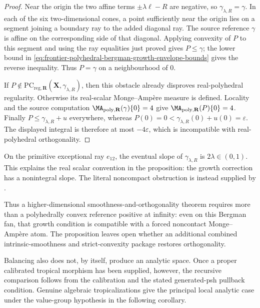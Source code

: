 \begin{proof}
Near the origin the two affine terms \(\pm\lambda\ell-R\) are negative,
so \(\gamma_{\lambda,R}=\gamma\).  In each of the six two-dimensional
cones, a point sufficiently near the origin lies on a segment joining a
boundary ray to the added diagonal ray.  The source reference \(\gamma\)
is affine on the corresponding side of that diagonal.  Applying convexity
of \(P\) to this segment and using the ray equalities just proved gives
\(P\leq\gamma\); the lower bound in
\eqref{eq:frontier-polyhedral-bergman-growth-envelope-bounds} gives the
reverse inequality.  Thus \(P=\gamma\) on a neighbourhood of \(0\).

If
\(P\notin\mathrm{PC}_{\mathrm{reg},\mathbf R}
(\mathbf X,\gamma_{\lambda,R})\), then this obstacle already disproves
real-polyhedral regularity.  Otherwise its real-scalar Monge--Amp\`ere
measure is defined.  Locality and the source computation
\(\MA_{\mathrm{poly},\mathbf R}(\gamma)\{0\}=4\) give
\(\MA_{\mathrm{poly},\mathbf R}(P)\{0\}=4\).  Finally \(P\leq
\gamma_{\lambda,R}+u\) everywhere, whereas
\(P(0)=0<\gamma_{\lambda,R}(0)+u(0)=\varepsilon\).  The displayed
integral is therefore at most \(-4\varepsilon\), which is incompatible
with real-polyhedral orthogonality.
\end{proof}

On the primitive exceptional ray \(e_{12}\), the eventual slope of
\(\gamma_{\lambda,R}\) is \(2\lambda\in(0,1)\).  This explains the
real scalar convention in the proposition: the growth correction has a
nonintegral slope.  The literal noncompact obstruction is instead supplied
by .

Thus a higher-dimensional smoothness-and-orthogonality theorem requires
more than a polyhedrally convex reference positive at infinity: even on
this Bergman fan, that growth condition is compatible with a forced
noncontact Monge--Amp\`ere atom.  The proposition leaves open whether an
additional combined intrinsic-smoothness and strict-convexity package restores
orthogonality.

Balancing also does not, by itself, produce an analytic space.  Once a
proper calibrated tropical morphism has been supplied, however, the
recursive comparison follows from the calibration and the stated
generated-psh pullback condition.  Genuine algebraic tropicalizations give
the principal local analytic case under the value-group hypothesis in the
following corollary.



